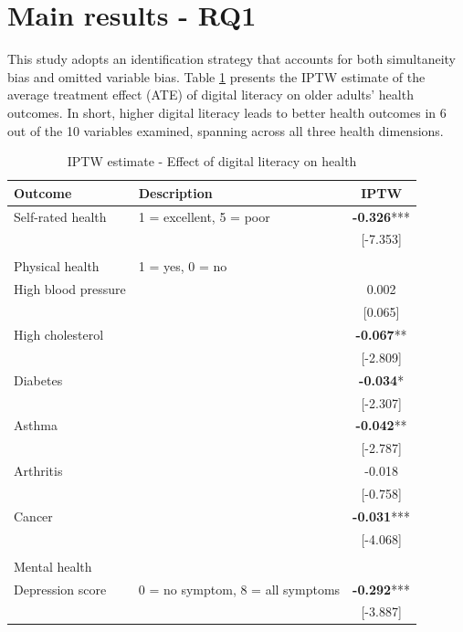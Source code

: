\section{Main results - RQ1}
This study adopts an identification strategy that accounts for both simultaneity bias and omitted variable bias. Table \ref{tab:iptw} presents the IPTW estimate of the average treatment effect (ATE) of digital literacy on older adults' health outcomes. In short, higher digital literacy leads to better health outcomes in 6 out of the 10 variables examined, spanning across all three health dimensions. 

\begin{table}[h!]
    \centering
    \caption{IPTW estimate - Effect of digital literacy on health}
    \label{tab:iptw}
    \begin{threeparttable}
        \begin{tabular}{llc}
            \toprule
            Outcome & Description & IPTW \\
            \midrule
            Self-rated health & 1 = excellent, 5 = poor & \textbf{-0.326}*** \\
            & & [-7.353] \\
            & & \\
            Physical health & 1 = yes, 0 = no & \\
            High blood pressure &  & 0.002 \\
            &  & [0.065] \\
            High cholesterol &  & \textbf{-0.067}** \\
            &  & [-2.809] \\
            Diabetes &  & \textbf{-0.034}* \\
            &  & [-2.307] \\
            Asthma &  & \textbf{-0.042}** \\
            &  & [-2.787] \\
            Arthritis &  & -0.018 \\
            &  & [-0.758] \\
            Cancer &  & \textbf{-0.031}*** \\
            &  & [-4.068] \\
            & & \\
            Mental health & & \\
            Depression score & 0 = no symptom, 8 = all symptoms & \textbf{-0.292}*** \\
            & & [-3.887] \\

\end{tabular}
\end{threeparttable}
\end{table}

